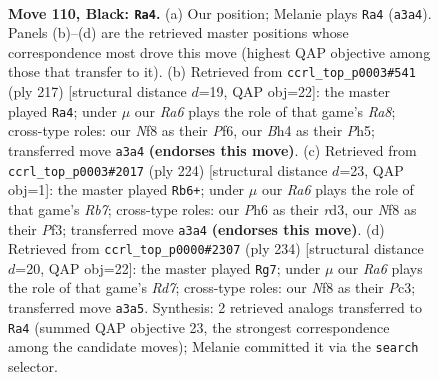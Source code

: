 \documentclass[11pt]{article}
\begin{document}
\clearpage

\begin{figure}[p]\centering
\begin{subfigure}{0.46\textwidth}\centering
\resizebox{\linewidth}{!}{%
\newchessgame
\chessboard[
  setfen={5n2/1R6/7p/4p3/6kb/r2p4/1K6/8 b - - 17 110},
  showmover=false,
  pgfstyle=straightmove, color=movearrow, markmove={a3-a4}
]}
\caption{}
\end{subfigure}\hfill
\begin{subfigure}{0.46\textwidth}\centering
\resizebox{\linewidth}{!}{%
\newchessgame
\chessboard[
  setfen={8/8/5p1k/P6p/1P3p2/8/1K4R1/r7 b - - 1 109},
  showmover=false,
  pgfstyle=straightmove, color=movearrow, markmove={a1-a4}
]}
\caption{}
\end{subfigure}
\\[4pt]
\begin{subfigure}{0.46\textwidth}\centering
\resizebox{\linewidth}{!}{%
\newchessgame
\chessboard[
  setfen={8/1R6/6k1/4p3/8/3r1PPK/8/8 w - - 37 113},
  showmover=false,
  pgfstyle=straightmove, color=movearrow, markmove={b7-b6}
]}
\caption{}
\end{subfigure}\hfill
\begin{subfigure}{0.46\textwidth}\centering
\resizebox{\linewidth}{!}{%
\newchessgame
\chessboard[
  setfen={8/P2R4/r1k5/8/8/2P5/2K5/8 w - - 27 118},
  showmover=false,
  pgfstyle=straightmove, color=movearrow, markmove={d7-g7}
]}
\caption{}
\end{subfigure}
\caption{\textbf{Move 110, Black: \texttt{Ra4}.} (a) Our position; Melanie plays \texttt{Ra4} (\texttt{a3a4}). Panels (b)--(d) are the retrieved master positions whose correspondence most drove this move (highest QAP objective among those that transfer to it). (b) Retrieved from \texttt{ccrl\_top\_p0003\#541} (ply 217) [structural distance $d$=19, QAP obj=22]: the master played \texttt{Ra4}; under $\mu$ our \emph{Ra6} plays the role of that game's \emph{Ra8}; cross-type roles: our \emph{N}f8 as their \emph{P}f6, our \emph{B}h4 as their \emph{P}h5; transferred move \texttt{a3a4} \textbf{(endorses this move)}. (c) Retrieved from \texttt{ccrl\_top\_p0003\#2017} (ply 224) [structural distance $d$=23, QAP obj=1]: the master played \texttt{Rb6+}; under $\mu$ our \emph{Ra6} plays the role of that game's \emph{Rb7}; cross-type roles: our \emph{P}h6 as their \emph{r}d3, our \emph{N}f8 as their \emph{P}f3; transferred move \texttt{a3a4} \textbf{(endorses this move)}. (d) Retrieved from \texttt{ccrl\_top\_p0000\#2307} (ply 234) [structural distance $d$=20, QAP obj=22]: the master played \texttt{Rg7}; under $\mu$ our \emph{Ra6} plays the role of that game's \emph{Rd7}; cross-type roles: our \emph{N}f8 as their \emph{P}c3; transferred move \texttt{a3a5}. Synthesis: 2 retrieved analogs transferred to \texttt{Ra4} (summed QAP objective 23, the strongest correspondence among the candidate moves); Melanie committed it via the \texttt{search} selector.}
\label{fig:thought-m219}
\end{figure}
\end{document}
